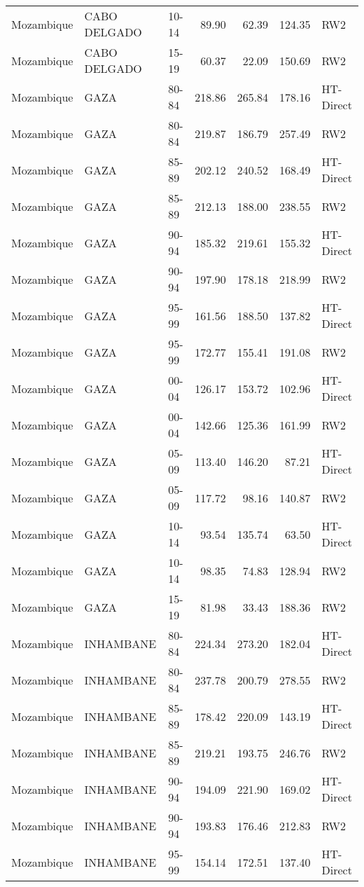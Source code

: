 \begin{longtable}{lllrrrl}
  Mozambique & CABO DELGADO & 10-14 & 89.90 & 62.39 & 124.35 & RW2 \\ 
  Mozambique & CABO DELGADO & 15-19 & 60.37 & 22.09 & 150.69 & RW2 \\ 
  Mozambique & GAZA & 80-84 & 218.86 & 265.84 & 178.16 & HT-Direct \\ 
  Mozambique & GAZA & 80-84 & 219.87 & 186.79 & 257.49 & RW2 \\ 
  Mozambique & GAZA & 85-89 & 202.12 & 240.52 & 168.49 & HT-Direct \\ 
  Mozambique & GAZA & 85-89 & 212.13 & 188.00 & 238.55 & RW2 \\ 
  Mozambique & GAZA & 90-94 & 185.32 & 219.61 & 155.32 & HT-Direct \\ 
  Mozambique & GAZA & 90-94 & 197.90 & 178.18 & 218.99 & RW2 \\ 
  Mozambique & GAZA & 95-99 & 161.56 & 188.50 & 137.82 & HT-Direct \\ 
  Mozambique & GAZA & 95-99 & 172.77 & 155.41 & 191.08 & RW2 \\ 
  Mozambique & GAZA & 00-04 & 126.17 & 153.72 & 102.96 & HT-Direct \\ 
  Mozambique & GAZA & 00-04 & 142.66 & 125.36 & 161.99 & RW2 \\ 
  Mozambique & GAZA & 05-09 & 113.40 & 146.20 & 87.21 & HT-Direct \\ 
  Mozambique & GAZA & 05-09 & 117.72 & 98.16 & 140.87 & RW2 \\ 
  Mozambique & GAZA & 10-14 & 93.54 & 135.74 & 63.50 & HT-Direct \\ 
  Mozambique & GAZA & 10-14 & 98.35 & 74.83 & 128.94 & RW2 \\ 
  Mozambique & GAZA & 15-19 & 81.98 & 33.43 & 188.36 & RW2 \\ 
  Mozambique & INHAMBANE & 80-84 & 224.34 & 273.20 & 182.04 & HT-Direct \\ 
  Mozambique & INHAMBANE & 80-84 & 237.78 & 200.79 & 278.55 & RW2 \\ 
  Mozambique & INHAMBANE & 85-89 & 178.42 & 220.09 & 143.19 & HT-Direct \\ 
  Mozambique & INHAMBANE & 85-89 & 219.21 & 193.75 & 246.76 & RW2 \\ 
  Mozambique & INHAMBANE & 90-94 & 194.09 & 221.90 & 169.02 & HT-Direct \\ 
  Mozambique & INHAMBANE & 90-94 & 193.83 & 176.46 & 212.83 & RW2 \\ 
  Mozambique & INHAMBANE & 95-99 & 154.14 & 172.51 & 137.40 & HT-Direct \\ 

\end{longtable}
